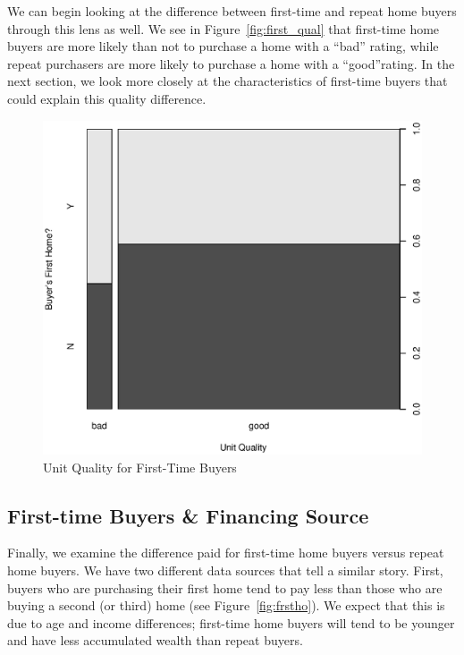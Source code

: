 \documentclass[11pt, fleqn]{article}
\begin{document}
We can begin looking at the difference between first-time and repeat home buyers through this lens as well. We see in Figure~\vref{fig:first_qual} that first-time home buyers are more likely than not to purchase a home with a ``bad'' rating, while repeat purchasers are more likely to purchase a home with a ``good''rating. In the next section, we look more closely at the characteristics of first-time buyers that could explain this quality difference.

\begin{figure}[!htb]
  \centering
  \includegraphics[scale=.5]{first_home_vs_home_quality.eps}
  \caption{Unit Quality for First-Time Buyers}
  \label{fig:first_qual}
\end{figure}

\subsection{First-time Buyers \& Financing Source}

Finally, we examine the difference paid for first-time home buyers versus repeat home buyers. We have two different data sources that tell a similar story. First, buyers who are purchasing their first home tend to pay less than those who are buying a second (or third) home (see Figure~\vref{fig:frstho}). We expect that this is due to age and income differences; first-time home buyers will tend to be younger and have less accumulated wealth than repeat buyers. 
\end{document}
